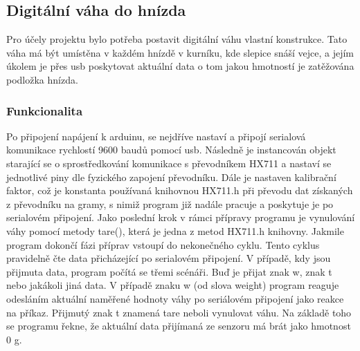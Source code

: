 

\subsection{Digitální váha do hnízda}\label{subsec:digitalni-vaha-do-hnizda}
Pro účely projektu bylo potřeba postavit digitální váhu vlastní konstrukce.
Tato váha má být umístěna v každém hnízdě v kurníku, kde slepice snáší vejce, a jejím úkolem je přes usb poskytovat aktuální data o tom jakou hmotností je zatěžována podložka hnízda.

\subsubsection{Funkcionalita}
Po připojení napájení k arduinu, se nejdříve nastaví a připojí serialová komunikace rychlostí 9600 baudů pomocí usb.
Následně je instancován objekt starající se o sprostředkování komunikace s převodníkem HX711 a nastaví se jednotlivé piny dle fyzického zapojení převodníku.
Dále je nastaven kalibrační faktor, což je konstanta používaná knihovnou HX711.h při převodu dat získaných z převodníku na gramy, s nimiž program již nadále pracuje a poskytuje je po serialovém připojení.
Jako poslední krok v rámci přípravy programu je vynulování váhy pomocí metody tare(), která je jedna z metod HX711.h knihovny.
Jakmile program dokončí fázi příprav vstoupí do nekonečného cyklu.
Tento cyklus pravidelně čte data přicházející po serialovém připojení.
V případě, kdy jsou přijmuta data, program počítá se třemi scénáři.
Buď je přijat znak w, znak t nebo jakákoli jiná data.
V případě znaku w (od slova weight) program reaguje odesláním aktuální naměřené hodnoty váhy po seriálovém připojení jako reakce na příkaz.
Přijmutý znak t znamená tare neboli vynulovat váhu.
Na základě toho se programu řekne, že aktuální data přijímaná ze senzoru má brát jako hmotnost 0 g.


